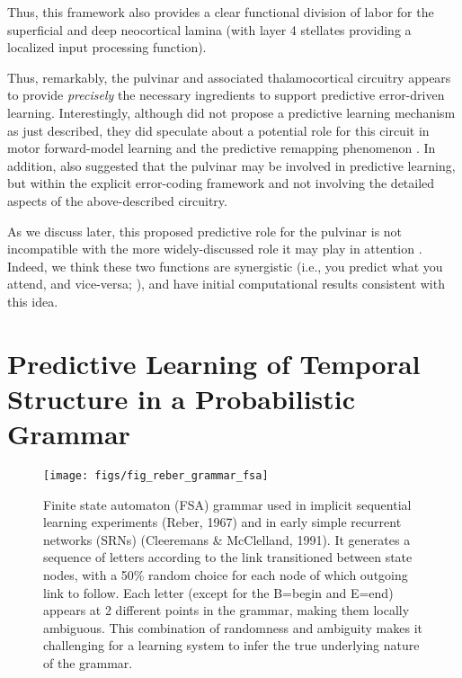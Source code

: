 \documentclass[11pt,twoside]{article}
\newif\myifpdf
\begin{document}
 Thus, this framework also provides a clear functional division of labor for the superficial and deep neocortical lamina (with layer 4 stellates providing a localized input processing function).


Thus, remarkably, the pulvinar and associated thalamocortical circuitry appears to provide \emph{precisely} the necessary ingredients to support predictive error-driven learning.  Interestingly, although \citet{ShermanGuillery06} did not propose a predictive learning mechanism as just described, they did speculate about a potential role for this circuit in motor forward-model learning and the predictive remapping phenomenon \citep{ShermanGuillery11,UsreySherman18}.  In addition, \citet{PennartzDoraMuckliEtAl19} also suggested that the pulvinar may be involved in predictive learning, but within the explicit error-coding framework and not involving the detailed aspects of the above-described circuitry.

As we discuss later, this proposed predictive role for the pulvinar is not incompatible with the more widely-discussed role it may play in attention \citep{LaBergeBuchsbaum90,BenderYouakim01,SnowAllenRafalEtAl09,SaalmannKastner11,ZhouSchaferDesimone16,FiebelkornKastner19}.  Indeed, we think these two functions are synergistic (i.e., you predict what you attend, and vice-versa; \citealp{RichterdeLange19}), and have initial computational results consistent with this idea.





\section{Predictive Learning of Temporal Structure in a Probabilistic Grammar}

\begin{figure}
  \centering\texttt{[image: figs/fig\_reber\_grammar\_fsa]}
  \caption{\footnotesize Finite state automaton (FSA) grammar used in implicit sequential learning experiments (Reber, 1967) and in early simple recurrent networks (SRNs) (Cleeremans \& McClelland, 1991).  It generates a sequence of letters according to the link transitioned between state nodes, with a 50\% random choice for each node of which outgoing link to follow.  Each letter (except for the B=begin and E=end) appears at 2 different points in the grammar, making them locally ambiguous.  This combination of randomness and ambiguity makes it challenging for a learning system to infer the true underlying nature of the grammar.}
  \label{fig.fsa_grammar}
\end{figure}
\end{document}
